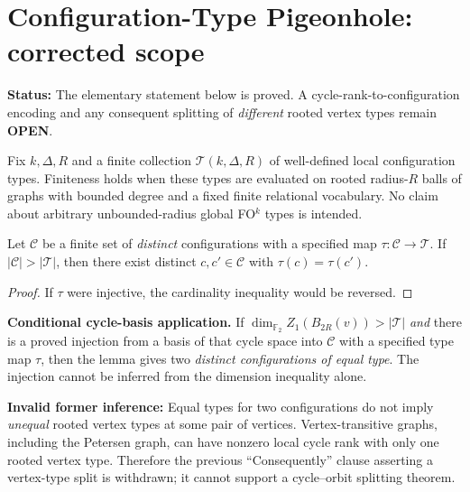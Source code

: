 \section*{Configuration-Type Pigeonhole: corrected scope}

\noindent\textbf{Status:} The elementary statement below is proved.
A cycle-rank-to-configuration encoding and any consequent splitting of
\emph{different} rooted vertex types remain \textbf{OPEN}.

Fix $k,\Delta,R$ and a finite collection $\mathcal T(k,\Delta,R)$ of
well-defined local configuration types. Finiteness holds when these types
are evaluated on rooted radius-$R$ balls of graphs with bounded degree
and a fixed finite relational vocabulary. No claim about arbitrary
unbounded-radius global FO$^k$ types is intended.

\begin{lemma}
Let $\mathcal C$ be a finite set of \emph{distinct} configurations with
a specified map $\tau:\mathcal C\to\mathcal T$. If
$|\mathcal C|>|\mathcal T|$, then there exist distinct
$c,c'\in\mathcal C$ with $\tau(c)=\tau(c')$.
\end{lemma}
\begin{proof}
If $\tau$ were injective, the cardinality inequality would be reversed.
\end{proof}

\noindent\textbf{Conditional cycle-basis application.}
If $\dim_{\mathbb F_2}Z_1(B_{2R}(v))>|\mathcal T|$ \emph{and}
there is a proved injection from a basis of that cycle space into
$\mathcal C$ with a specified type map $\tau$, then the lemma gives two
\emph{distinct configurations of equal type}. The injection cannot be
inferred from the dimension inequality alone.

\noindent\textbf{Invalid former inference:} Equal types for two
configurations do not imply \emph{unequal} rooted vertex types at some
pair of vertices. Vertex-transitive graphs, including the Petersen graph,
can have nonzero local cycle rank with only one rooted vertex type.
Therefore the previous ``Consequently'' clause asserting a vertex-type
split is withdrawn; it cannot support a cycle--orbit splitting theorem.
